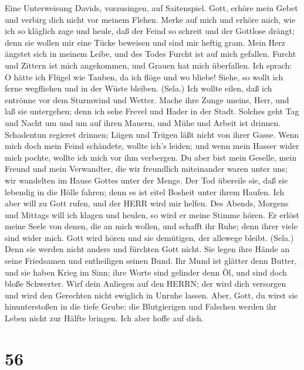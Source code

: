  Eine Unterweisung Davids, vorzusingen, auf Saitenspiel.
Gott, erhöre mein Gebet und verbirg dich nicht vor meinem Flehen.
 Merke auf mich und erhöre mich, wie ich so kläglich zage
und heule,  daß der Feind so schreit und der Gottlose
drängt; denn sie wollen mir eine Tücke beweisen und sind mir heftig
gram.  Mein Herz ängstet sich in meinem Leibe, und des Todes
Furcht ist auf mich gefallen.  Furcht und Zittern ist mich
angekommen, und Grauen hat mich überfallen.  Ich sprach: O
hätte ich Flügel wie Tauben, da ich flöge und wo bliebe! 
Siehe, so wollt ich ferne wegfliehen und in der Wüste bleiben. (Sela.)
 Ich wollte eilen, daß ich entrönne vor dem Sturmwind und
Wetter.  Mache ihre Zunge uneins, Herr, und laß sie
untergehen; denn ich sehe Frevel und Hader in der Stadt. 
Solches geht Tag und Nacht um und um auf ihren Mauern, und Mühe und
Arbeit ist drinnen.  Schadentun regieret drinnen; Lügen und
Trügen läßt nicht von ihrer Gasse.  Wenn mich doch mein
Feind schändete, wollte ich's leiden; und wenn mein Hasser wider mich
pochte, wollte ich mich vor ihm verbergen.  Du aber bist
mein Geselle, mein Freund und mein Verwandter,  die wir
freundlich miteinander waren unter uns; wir wandelten im Hause Gottes
unter der Menge.  Der Tod übereile sie, daß sie lebendig in
die Hölle fahren; denn es ist eitel Bosheit unter ihrem Haufen.
 Ich aber will zu Gott rufen, und der HERR wird mir helfen.
 Des Abends, Morgens und Mittags will ich klagen und
heulen, so wird er meine Stimme hören.  Er erlöst meine
Seele von denen, die an mich wollen, und schafft ihr Ruhe; denn ihrer
viele sind wider mich.  Gott wird hören und sie demütigen,
der allewege bleibt. (Sela.) Denn sie werden nicht anders und fürchten
Gott nicht.  Sie legen ihre Hände an seine Friedsamen und
entheiligen seinen Bund.  Ihr Mund ist glätter denn Butter,
und sie haben Krieg im Sinn; ihre Worte sind gelinder denn Öl, und sind
doch bloße Schwerter.  Wirf dein Anliegen auf den HERRN;
der wird dich versorgen und wird den Gerechten nicht ewiglich in Unruhe
lassen.  Aber, Gott, du wirst sie hinunterstoßen in die
tiefe Grube: die Blutgierigen und Falschen werden ihr Leben nicht zur
Hälfte bringen. Ich aber hoffe auf dich.

\hypertarget{section-55}{%
\section{56}\label{section-55}}

